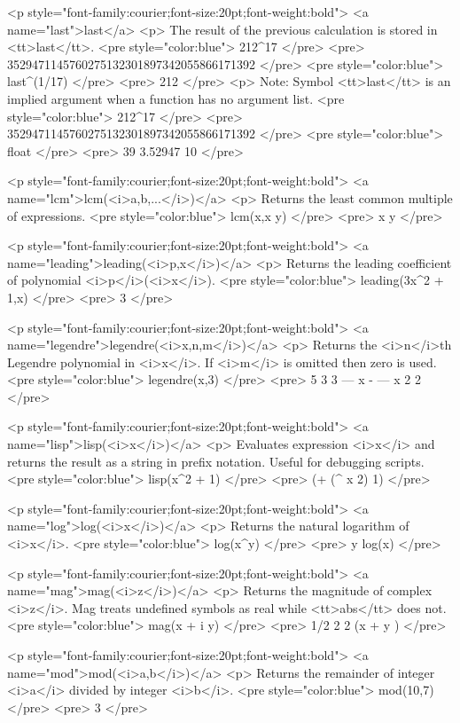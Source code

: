 <p style="font-family:courier;font-size:20pt;font-weight:bold">
<a name="last">last</a>
<p>
The result of the previous calculation is stored in <tt>last</tt>.
<pre style="color:blue">
212^17
</pre>
<pre>
3529471145760275132301897342055866171392
</pre>
<pre style="color:blue">
last^(1/17)
</pre>
<pre>
212
</pre>
<p>
Note: Symbol <tt>last</tt> is an implied argument when a function has no
argument list.
<pre style="color:blue">
212^17
</pre>
<pre>
3529471145760275132301897342055866171392
</pre>
<pre style="color:blue">
float
</pre>
<pre>
          39
3.52947 10
</pre>

<p style="font-family:courier;font-size:20pt;font-weight:bold">
<a name="lcm">lcm(<i>a,b,...</i>)</a>
<p>
Returns the least common multiple of expressions.
<pre style="color:blue">
lcm(x,x y)
</pre>
<pre>
x y
</pre>

<p style="font-family:courier;font-size:20pt;font-weight:bold">
<a name="leading">leading(<i>p,x</i>)</a>
<p>
Returns the leading coefficient of polynomial <i>p</i>(<i>x</i>).
<pre style="color:blue">
leading(3x^2 + 1,x)
</pre>
<pre>
3
</pre>

<p style="font-family:courier;font-size:20pt;font-weight:bold">
<a name="legendre">legendre(<i>x,n,m</i>)</a>
<p>
Returns the <i>n</i>th Legendre polynomial in <i>x</i>.
If <i>m</i> is omitted then zero is used.
<pre style="color:blue">
legendre(x,3)
</pre>
<pre>
 5   3    3
--- x  - --- x
 2        2
</pre>

<p style="font-family:courier;font-size:20pt;font-weight:bold">
<a name="lisp">lisp(<i>x</i>)</a>
<p>
Evaluates expression <i>x</i> and returns the result as a
string in prefix notation.
Useful for debugging scripts.
<pre style="color:blue">
lisp(x^2 + 1)
</pre>
<pre>
(+ (^ x 2) 1)
</pre>

<p style="font-family:courier;font-size:20pt;font-weight:bold">
<a name="log">log(<i>x</i>)</a>
<p>
Returns the natural logarithm of <i>x</i>.
<pre style="color:blue">
log(x^y)
</pre>
<pre>
y log(x)
</pre>

<p style="font-family:courier;font-size:20pt;font-weight:bold">
<a name="mag">mag(<i>z</i>)</a>
<p>
Returns the magnitude of complex <i>z</i>.
Mag treats undefined symbols as real while <tt>abs</tt> does not.
<pre style="color:blue">
mag(x + i y)
</pre>
<pre>
         1/2
  2    2
(x  + y )
</pre>

<p style="font-family:courier;font-size:20pt;font-weight:bold">
<a name="mod">mod(<i>a,b</i>)</a>
<p>
Returns the remainder of integer <i>a</i> divided by integer <i>b</i>.
<pre style="color:blue">
mod(10,7)
</pre>
<pre>
3
</pre>

